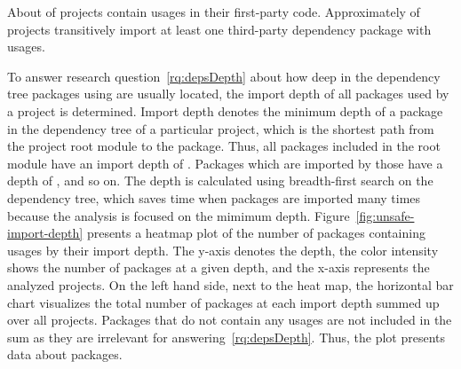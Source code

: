 \begin{answerToRQ}[\ref{rq:prevalApp}]
    About \percentageUnsafeProjectsRounded{} of projects contain \unsafe{} usages in their first-party code.
    Approximately \percentageUnsafeTransitiveWithDependenciesRounded{} of projects transitively import at least one
    third-party dependency package with \unsafe{} usages.
\end{answerToRQ}

To answer research question~\ref{rq:depsDepth} about how deep in the dependency tree packages using \unsafe{} are
usually located, the import depth of all packages used by a project is determined.
Import depth denotes the minimum depth of a package in the dependency tree of a particular project, which is the
shortest path from the project root module to the package.
Thus, all packages included in the root module have an import depth of .
Packages which are imported by those have a depth of , and so on.
The depth is calculated using breadth-first search on the dependency tree, which saves time when packages are imported
many times because the analysis is focused on the mimimum depth.
Figure~\ref{fig:unsafe-import-depth} presents a heatmap plot of the number of packages containing \unsafe{} usages by
their import depth.
The y-axis denotes the depth, the color intensity shows the number of \unsafe{} packages at a given depth, and the
x-axis represents the \projsAnalyzed{} analyzed projects.
On the left hand side, next to the heat map, the horizontal bar chart visualizes the total number of packages at each
import depth summed up over all projects.
Packages that do not contain any \unsafe{} usages are not included in the sum as they are irrelevant for
answering~\ref{rq:depsDepth}.
Thus, the plot presents data about \unsafePackages{} packages.



